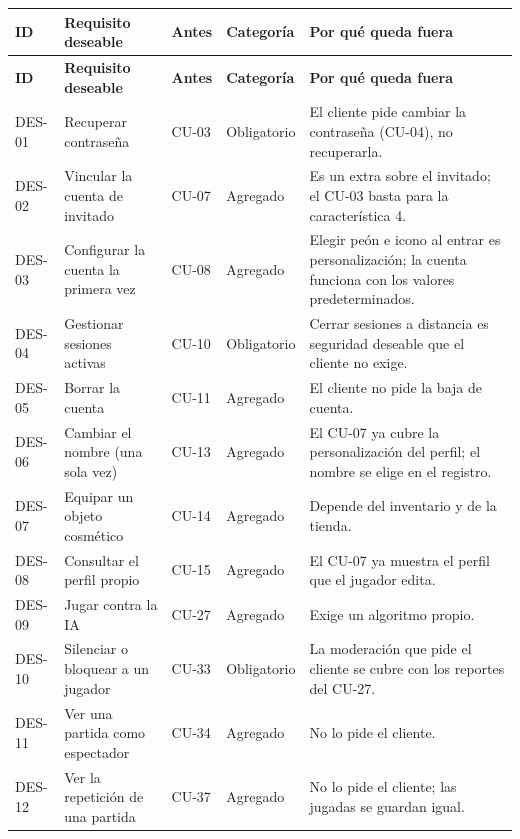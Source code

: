 \begin{center}\small
\begin{longtable}{|L{0.075\textwidth}|L{0.25\textwidth}|L{0.07\textwidth}|L{0.11\textwidth}|L{0.37\textwidth}|}
\hline
\textbf{ID} & \textbf{Requisito deseable} & \textbf{Antes} & \textbf{Categoría} & \textbf{Por qué queda fuera} \\ \hline
\endfirsthead
\hline
\textbf{ID} & \textbf{Requisito deseable} & \textbf{Antes} & \textbf{Categoría} & \textbf{Por qué queda fuera} \\ \hline
\endhead
\mbox{DES-01} & Recuperar contraseña & CU-03 & Obligatorio & El cliente pide cambiar la contraseña (\mbox{CU-04}), no recuperarla. \\ \hline
\mbox{DES-02} & Vincular la cuenta de invitado & CU-07 & Agregado & Es un extra sobre el invitado; el \mbox{CU-03} basta para la característica 4. \\ \hline
\mbox{DES-03} & Configurar la cuenta la primera vez & CU-08 & Agregado & Elegir peón e icono al entrar es personalización; la cuenta funciona con los valores predeterminados. \\ \hline
\mbox{DES-04} & Gestionar sesiones activas & CU-10 & Obligatorio & Cerrar sesiones a distancia es seguridad deseable que el cliente no exige. \\ \hline
\mbox{DES-05} & Borrar la cuenta & CU-11 & Agregado & El cliente no pide la baja de cuenta. \\ \hline
\mbox{DES-06} & Cambiar el nombre (una sola vez) & CU-13 & Agregado & El \mbox{CU-07} ya cubre la personalización del perfil; el nombre se elige en el registro. \\ \hline
\mbox{DES-07} & Equipar un objeto cosmético & CU-14 & Agregado & Depende del inventario y de la tienda. \\ \hline
\mbox{DES-08} & Consultar el perfil propio & CU-15 & Agregado & El \mbox{CU-07} ya muestra el perfil que el jugador edita. \\ \hline
\mbox{DES-09} & Jugar contra la IA & CU-27 & Agregado & Exige un algoritmo propio. \\ \hline
\mbox{DES-10} & Silenciar o bloquear a un jugador & CU-33 & Obligatorio & La moderación que pide el cliente se cubre con los reportes del \mbox{CU-27}. \\ \hline
\mbox{DES-11} & Ver una partida como espectador & CU-34 & Agregado & No lo pide el cliente. \\ \hline
\mbox{DES-12} & Ver la repetición de una partida & CU-37 & Agregado & No lo pide el cliente; las jugadas se guardan igual. \\ \hline

\end{longtable}
\end{center}
